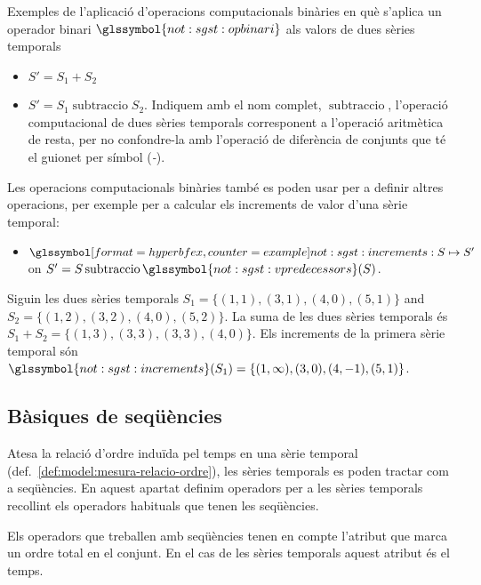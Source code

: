 \begin{example}
  Exemples de l'aplicació d'operacions computacionals binàries en què
  s'aplica un operador binari $ \glssymbol{not:sgst:opbinari}$ als
  valors de dues sèries temporals
  \begin{itemize}
  \item $S' = S_1 + S_2$ 
  \item $S' = S_1 \operatorname{subtraccio} S_2$. Indiquem amb el
    nom complet, $\operatorname{subtraccio}$, l'operació computacional
    de dues sèries temporals corresponent a l'operació aritmètica de
    resta, per no confondre-la amb l'operació de diferència de
    conjunts que té el guionet per símbol (\emph{-}).
  \end{itemize}
  
  Les operacions computacionals binàries també es poden usar per a
  definir altres operacions, per exemple per a calcular els increments de valor
  d'una sèrie temporal:
  \begin{itemize}
  \item $\glssymbolex{not:sgst:increments}: S \mapsto S'$ on $S'=
    S \operatorname{subtraccio} \glssymbol{not:sgst:vpredecessors}(S)$.
  \end{itemize}
\end{example}




\begin{example}
  Siguin les dues sèries temporals $S_1=\{(1,1),(3,1),(4,0),(5,1)\}$
  and $S_2=\{(1,2),(3,2),(4,0),(5,2)\}$. %
  La suma de les dues sèries temporals és
  $S_1+S_2=\{(1,3),(3,3),(3,3),(4,0)\}$. %
  Els increments de la primera sèrie temporal són
  $\glssymbol{not:sgst:increments}(S_1)=\{(1,\infty),(3,0),(4,-1),(5,1)\}$.
\end{example}




\subsection{Bàsiques de seqüències}


Atesa la relació d'ordre induïda pel temps en una sèrie temporal
(def.\ \ref{def:model:mesura-relacio-ordre}), les sèries temporals es
poden tractar com a seqüències.  En aquest apartat definim operadors
per a les sèries temporals recollint els operadors habituals que tenen
les seqüències. 

Els operadors que treballen amb seqüències tenen en compte l'atribut
que marca un ordre total en el conjunt. En el cas de les sèries
temporals aquest atribut és el temps.



